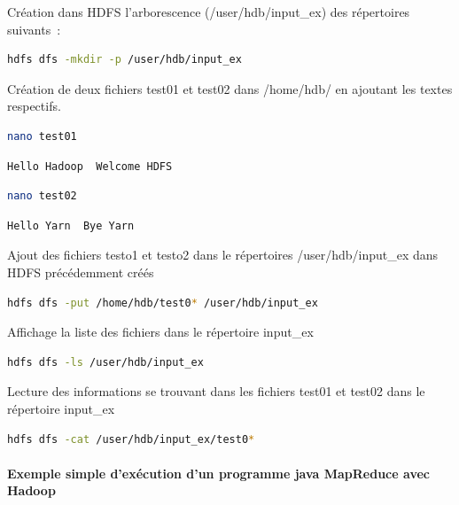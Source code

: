 \documentclass[12pt,french]{book}
\begin{document}
Création dans HDFS l’arborescence (/user/hdb/input\_ex) des répertoires suivants :

\begin{lstlisting}[language=bash, frame=single]
hdfs dfs -mkdir -p /user/hdb/input_ex
\end{lstlisting}

Création de deux fichiers test01 et test02 dans /home/hdb/ en ajoutant les textes respectifs.

\begin{lstlisting}[language=bash, frame=single]
nano test01
\end{lstlisting}

\begin{lstlisting}[language=bash, frame=single]
Hello Hadoop  Welcome HDFS
\end{lstlisting}

\begin{lstlisting}[language=bash, frame=single]
nano test02
\end{lstlisting}

\begin{lstlisting}[language=bash, frame=single]
Hello Yarn  Bye Yarn
\end{lstlisting}

Ajout des fichiers testo1 et testo2 dans le répertoires /user/hdb/input\_ex dans HDFS précédemment créés

\begin{lstlisting}[language=bash, frame=single]
hdfs dfs -put /home/hdb/test0* /user/hdb/input_ex
\end{lstlisting}

Affichage la liste des fichiers dans le répertoire input\_ex

\begin{lstlisting}[language=bash, frame=single]
hdfs dfs -ls /user/hdb/input_ex
\end{lstlisting}

Lecture des informations se trouvant dans les fichiers test01 et test02 dans le répertoire input\_ex  

\begin{lstlisting}[language=bash, frame=single]
hdfs dfs -cat /user/hdb/input_ex/test0*
\end{lstlisting}

\paragraph{Exemple simple d’exécution d’un programme java MapReduce avec Hadoop}\mbox{}\\
\end{document}
